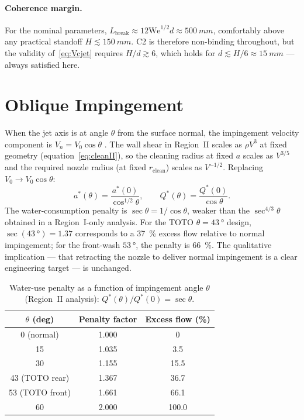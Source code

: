 \documentclass[aps,prfluids,reprint,amsmath,amssymb,floatfix]{revtex4-2}
\newcommand{\We}{\mathrm{We}}
\begin{document}
\paragraph{Coherence margin.}
For the nominal parameters, $L_\mathrm{break} \approx 12\We^{1/2}d \approx
\SI{500}{mm}$, comfortably above any practical standoff $H \lesssim
\SI{150}{mm}$. C2 is therefore non-binding throughout, but the validity
of~\eqref{eq:Vcjet} requires $H/d \gtrsim 6$, which holds for
$d \lesssim H/6 \approx \SI{15}{mm}$ --- always satisfied here.

\section{Oblique Impingement}
\label{sec:oblique}

When the jet axis is at angle $\theta$ from the surface normal, the
impingement velocity component is $V_n = V_0 \cos\theta$
\citep{BeitelmalEtAl2000}. The wall
shear in Region~II scales as $\rho V^3$ at fixed geometry
(equation~\eqref{eq:cleanII}), so the cleaning radius at fixed $a$
scales as $V^{3/5}$ and the required nozzle radius (at fixed
$r_\mathrm{clean}$) scales as $V^{-1/2}$. Replacing $V_0 \to V_0\cos\theta$:
\begin{equation}
  a^*(\theta) = \frac{a^*(0)}{\cos^{1/2}\theta},
  \qquad
  Q^*(\theta) = \frac{Q^*(0)}{\cos\theta}.
  \label{eq:obliqueII}
\end{equation}
The water-consumption penalty is $\sec\theta = 1/\cos\theta$, weaker than
the $\sec^{4/3}\theta$ obtained in a Region~I-only analysis. For the
TOTO $\theta = \SI{43}{\degree}$ design,
$\sec(\SI{43}{\degree}) = 1.37$ corresponds to a \SI{37}{\percent}
excess flow relative to normal impingement; for the front-wash
$\SI{53}{\degree}$, the penalty is \SI{66}{\percent}. The qualitative
implication --- that retracting the nozzle to deliver normal
impingement is a clear engineering target --- is unchanged.

\begin{table}[h]
\centering
\caption{Water-use penalty as a function of impingement angle $\theta$
(Region~II analysis): $Q^*(\theta)/Q^*(0) = \sec\theta$.}
\label{tab:oblique}
\begin{tabular}{ccc}
\toprule
$\theta$ (deg) & Penalty factor & Excess flow (\%) \\
\midrule
0 (normal)  & 1.000 & 0 \\
15          & 1.035 & 3.5 \\
30          & 1.155 & 15.5 \\
43 (TOTO rear)  & 1.367 & 36.7 \\
53 (TOTO front) & 1.661 & 66.1 \\
60          & 2.000 & 100.0 \\
\bottomrule
\end{tabular}
\end{table}
\end{document}
